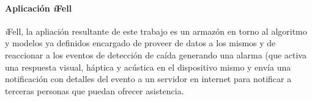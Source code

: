 \documentclass[11pt,a4paper,spanish,twocolumn]{article}
\def\ifell/{\textsl{\textsf{i}}\textsf{Fell}}
\begin{document}

\paragraph{Aplicación \ifell/}

\ifell/, la apliación resultante de este trabajo es un armazón en torno al algoritmo y modelos ya definidos encargado de proveer de datos a los mismos y de reaccionar a los eventos de detección de caída generando una alarma (que activa una respuesta visual, háptica y acústica en el dispositivo mismo y envía una notificación con detalles del evento a un servidor en internet para notificar a terceras personas que puedan ofrecer asistencia.
\end{document}
